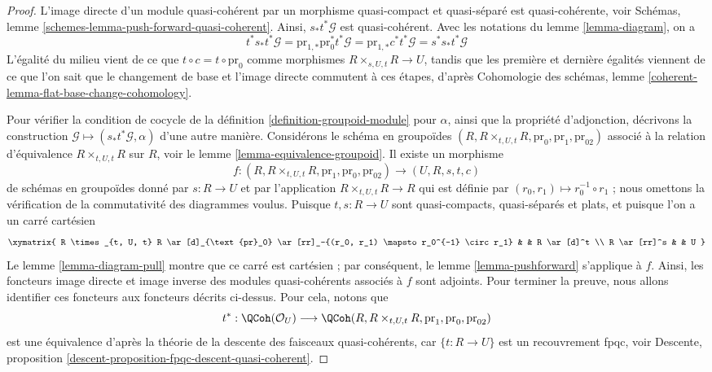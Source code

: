 \begin{proof}
L'image directe d'un module quasi-cohérent par un morphisme quasi-compact et
quasi-séparé est quasi-cohérente, voir Schémas, lemme
\ref{schemes-lemma-push-forward-quasi-coherent}. Ainsi, $s_*t^*\mathcal{G}$
est quasi-cohérent. Avec les notations du lemme \ref{lemma-diagram}, on a
$$
t^*s_*t^*\mathcal{G} =
\text{pr}_{1, *}\text{pr}_0^*t^*\mathcal{G} =
\text{pr}_{1, *}c^*t^*\mathcal{G} =
s^*s_*t^*\mathcal{G}
$$
L'égalité du milieu vient de ce que $t \circ c = t \circ \text{pr}_0$ comme
morphismes $R \times_{s, U, t} R \to U$, tandis que les première et dernière
égalités viennent de ce que l'on sait que le changement de base et l'image directe commutent
à ces étapes, d'après Cohomologie des schémas, lemme
\ref{coherent-lemma-flat-base-change-cohomology}.

\medskip\noindent
Pour vérifier la condition de cocycle de la définition \ref{definition-groupoid-module}
pour $\alpha$, ainsi que la propriété d'adjonction, décrivons la construction
$\mathcal{G} \mapsto (s_*t^*\mathcal{G}, \alpha)$ d'une autre manière.
Considérons le schéma en groupoïdes
$(R, R \times_{t, U, t} R, \text{pr}_0, \text{pr}_1, \text{pr}_{02})$
associé à la relation d'équivalence $R \times_{t, U, t} R$
sur $R$, voir le lemme \ref{lemma-equivalence-groupoid}.
Il existe un morphisme
$$
f :
(R, R \times_{t, U, t} R, \text{pr}_1, \text{pr}_0, \text{pr}_{02})
\longrightarrow
(U, R, s, t, c)
$$
de schémas en groupoïdes donné par $s : R \to U$ et par l'application $R \times_{t, U, t} R \to R$
qui est définie par $(r_0, r_1) \mapsto r_0^{-1} \circ r_1$ ; nous omettons la vérification
de la commutativité des diagrammes voulus. Puisque
$t, s : R \to U$ sont quasi-compacts, quasi-séparés et plats,
et puisque l'on a un carré cartésien
$$
\xymatrix{
R \times_{t, U, t} R \ar[d]_{\text{pr}_0}
\ar[rr]_-{(r_0, r_1) \mapsto r_0^{-1} \circ r_1} & & R \ar[d]^t \\
R \ar[rr]^s & & U
}
$$
Le lemme \ref{lemma-diagram-pull} montre que ce carré est cartésien ; par conséquent, le
lemme \ref{lemma-pushforward} s'applique à $f$.
Ainsi, les foncteurs image directe et image inverse des modules quasi-cohérents associés à
$f$ sont adjoints. Pour terminer la preuve, nous allons identifier ces foncteurs
aux foncteurs décrits ci-dessus. Pour cela, notons que
$$
t^* :
\QCoh(\mathcal{O}_U)
\longrightarrow
\QCoh(R, R \times_{t, U, t} R, \text{pr}_1, \text{pr}_0, \text{pr}_{02})
$$
est une équivalence d'après la théorie de la descente des faisceaux quasi-cohérents, car
$\{t : R \to U\}$ est un recouvrement fpqc, voir
Descente, proposition \ref{descent-proposition-fpqc-descent-quasi-coherent}.


\end{proof}
